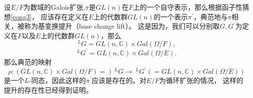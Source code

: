   \begin{example}
  设$E/F$为数域的Galois扩张,$\pi$是$GL(n)$在$F$上的一个自守表示，那么根据函子性猜想\ref{cong3}，
  应该存在定义在$E$上的代数群$GL(n)$的一个表示$\pi^{\prime}$，典范地与$\pi$相关，被称为基变换提升（base change lift）。
  这是因为，我们可以分别取$G,G^{\prime}$为定义在$F$以及$E$上的代数群$GL(n)$，那么
  $$^LG=GL(n,\mathbb{C})\times Gal(\Omega/F),$$
  $$^LG^{\prime}=GL(n,\mathbb{C})\times Gal(\Omega/E).$$
  那么典范的映射
  $$\rho: (GL(n,\mathbb{C})\times Gal(\Omega/F)=)\ ^LG\rightarrow \ ^LG^{\prime}(=GL(n,\mathbb{C})\times
  Gal(\Omega/E))$$
  是一个$L$-同态，因此这样的$\pi^{\prime}$应该是存在的。对$E/F$为循环扩张的情况，
  这样的提升的存在性已经得到证明。
  \end{example}
